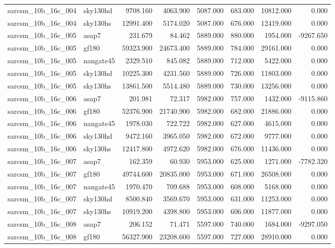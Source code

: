 \begin{tabular}{llrrrrrr}
sarcsm\_10b\_16c\_004 & sky130hd & 9708.160 & 4063.900 & 5087.000 & 683.000 & 10812.000 & 0.000 \\
sarcsm\_10b\_16c\_004 & sky130hs & 12991.400 & 5174.020 & 5087.000 & 676.000 & 12419.000 & 0.000 \\
sarcsm\_10b\_16c\_005 & asap7 & 231.679 & 84.462 & 5889.000 & 880.000 & 1954.000 & -9267.650 \\
sarcsm\_10b\_16c\_005 & gf180 & 59323.900 & 24673.400 & 5889.000 & 784.000 & 29161.000 & 0.000 \\
sarcsm\_10b\_16c\_005 & nangate45 & 2329.510 & 845.082 & 5889.000 & 712.000 & 5422.000 & 0.000 \\
sarcsm\_10b\_16c\_005 & sky130hd & 10225.300 & 4231.560 & 5889.000 & 726.000 & 11803.000 & 0.000 \\
sarcsm\_10b\_16c\_005 & sky130hs & 13861.500 & 5514.480 & 5889.000 & 730.000 & 13256.000 & 0.000 \\
sarcsm\_10b\_16c\_006 & asap7 & 201.981 & 72.317 & 5982.000 & 757.000 & 1432.000 & -9115.860 \\
sarcsm\_10b\_16c\_006 & gf180 & 52376.900 & 21740.900 & 5982.000 & 682.000 & 21886.000 & 0.000 \\
sarcsm\_10b\_16c\_006 & nangate45 & 1978.030 & 722.722 & 5982.000 & 627.000 & 4615.000 & 0.000 \\
sarcsm\_10b\_16c\_006 & sky130hd & 9472.160 & 3965.050 & 5982.000 & 672.000 & 9777.000 & 0.000 \\
sarcsm\_10b\_16c\_006 & sky130hs & 12417.800 & 4972.620 & 5982.000 & 676.000 & 11436.000 & 0.000 \\
sarcsm\_10b\_16c\_007 & asap7 & 162.359 & 60.930 & 5953.000 & 625.000 & 1271.000 & -7782.320 \\
sarcsm\_10b\_16c\_007 & gf180 & 49744.600 & 20835.000 & 5953.000 & 671.000 & 26508.000 & 0.000 \\
sarcsm\_10b\_16c\_007 & nangate45 & 1970.470 & 709.688 & 5953.000 & 608.000 & 5168.000 & 0.000 \\
sarcsm\_10b\_16c\_007 & sky130hd & 8500.840 & 3569.670 & 5953.000 & 631.000 & 11253.000 & 0.000 \\
sarcsm\_10b\_16c\_007 & sky130hs & 10919.200 & 4398.800 & 5953.000 & 606.000 & 11877.000 & 0.000 \\
sarcsm\_10b\_16c\_008 & asap7 & 206.152 & 71.471 & 5597.000 & 740.000 & 1684.000 & -9297.050 \\
sarcsm\_10b\_16c\_008 & gf180 & 56327.900 & 23208.600 & 5597.000 & 727.000 & 28910.000 & 0.000 \\

\end{tabular}
